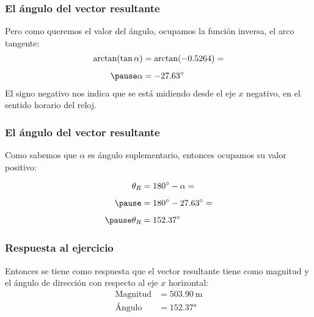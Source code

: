 \documentclass[12pt]{beamer}
\begin{document}
\begin{frame}
\frametitle{El ángulo del vector resultante}
Pero como queremos el valor del ángulo, ocupamos la función inversa, el arco tangente:
\pause
\begin{eqnarray*}
\begin{aligned}
\arctan(\tan \alpha) &= \arctan(-0.5264) = \\[0.5em] \pause
\alpha &= -\ang{27.63}
\end{aligned}
\end{eqnarray*}
\pause
El signo negativo nos indica que se está midiendo desde el eje $x$ negativo, en el sentido horario del reloj.
\end{frame}
\begin{frame}
\frametitle{El ángulo del vector resultante}
Como sabemos que $\alpha$ es ángulo suplementario, entonces ocupamos su valor positivo:
\pause
\begin{minipage}{0.5\linewidth}
\begin{eqnarray*}
\begin{aligned}
\theta_{R} &= \ang{180} - \alpha = \\[0.5em] \pause
&= \ang{180} - \ang{27.63} = \\[0.5em] \pause
\theta_{R} &= \ang{152.37}
\end{aligned}
\end{eqnarray*}
\end{minipage}
\begin{minipage}{0.35\linewidth}
\begin{figure}
\centering
{}
\end{figure}
\end{minipage}
\end{frame}
\begin{frame}
\frametitle{Respuesta al ejercicio}
Entonces se tiene como respuesta que el vector resultante tiene como magnitud y el ángulo de dirección con respecto al eje $x$ horizontal:
\begin{align*}
\text{Magnitud} &= \SI{503.90}{\meter} \\[0.5em]
\text{Ángulo} &= \ang{152.37}
\end{align*}
\end{frame}
\end{document}
